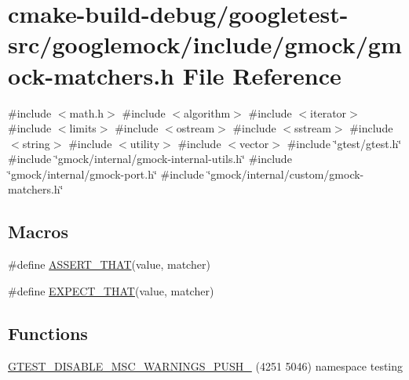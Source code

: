 \hypertarget{gmock-matchers_8h}{}\section{cmake-\/build-\/debug/googletest-\/src/googlemock/include/gmock/gmock-\/matchers.h File Reference}
\label{gmock-matchers_8h}
{\ttfamily \#include $<$math.\+h$>$}\newline
{\ttfamily \#include $<$algorithm$>$}\newline
{\ttfamily \#include $<$iterator$>$}\newline
{\ttfamily \#include $<$limits$>$}\newline
{\ttfamily \#include $<$ostream$>$}\newline
{\ttfamily \#include $<$sstream$>$}\newline
{\ttfamily \#include $<$string$>$}\newline
{\ttfamily \#include $<$utility$>$}\newline
{\ttfamily \#include $<$vector$>$}\newline
{\ttfamily \#include \char`\"{}gtest/gtest.\+h\char`\"{}}\newline
{\ttfamily \#include \char`\"{}gmock/internal/gmock-\/internal-\/utils.\+h\char`\"{}}\newline
{\ttfamily \#include \char`\"{}gmock/internal/gmock-\/port.\+h\char`\"{}}\newline
{\ttfamily \#include \char`\"{}gmock/internal/custom/gmock-\/matchers.\+h\char`\"{}}\newline
\subsection*{Macros}
\begin{DoxyCompactItemize}
\item 
\#define \mbox{\hyperlink{gmock-matchers_8h_a41d888579850c16583baea33ee8d057e}{A\+S\+S\+E\+R\+T\+\_\+\+T\+H\+AT}}(value,  matcher)
\item 
\#define \mbox{\hyperlink{gmock-matchers_8h_ac31e206123aa702e1152bb2735b31409}{E\+X\+P\+E\+C\+T\+\_\+\+T\+H\+AT}}(value,  matcher)
\end{DoxyCompactItemize}
\subsection*{Functions}
\begin{DoxyCompactItemize}
\item 
\mbox{\hyperlink{gmock-matchers_8h_a6a94bda146dc6f37279760c6fe12e3b9}{G\+T\+E\+S\+T\+\_\+\+D\+I\+S\+A\+B\+L\+E\+\_\+\+M\+S\+C\+\_\+\+W\+A\+R\+N\+I\+N\+G\+S\+\_\+\+P\+U\+S\+H\+\_\+}} (4251 5046) namespace testing
\end{DoxyCompactItemize}


